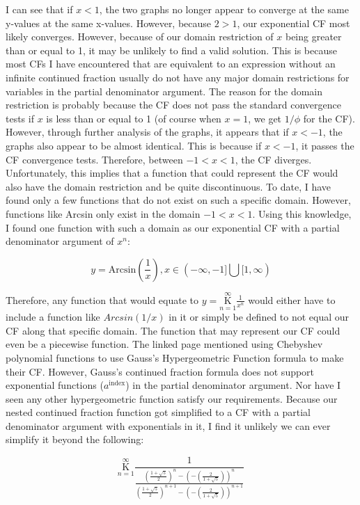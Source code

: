 \documentclass{article}
\begin{document}
I can see that if $x<1$, the two graphs no longer appear to converge at the same y-values at the same x-values. However, because $2>1$, our exponential CF most likely converges. However, because of our domain restriction of $x$ being greater than or equal to 1, it may be unlikely to find a valid solution. This is because most CFs I have encountered that are equivalent to an expression without an infinite continued fraction usually do not have any major domain restrictions for variables in the partial denominator argument. The reason for the domain restriction is probably because the CF does not pass the standard convergence tests if $x$ is less than or equal to 1 (of course when $x=1$, we get $1 / \phi$ for the CF). However, through further analysis of the graphs, it appears that if $x<-1$, the graphs also appear to be almost identical. This is because if $x<-1$, it passes the CF convergence tests. Therefore, between $-1<x<1$, the CF diverges. Unfortunately, this implies that a function that could represent the CF would also have the domain restriction and be quite discontinuous. To date, I have found only a few functions that do not exist on such a specific domain. However, functions like Arcsin only exist in the domain $-1<x<1$. Using this knowledge, I found one function with such a domain as our exponential CF with a partial denominator argument of $x^n$:

$$y=\text{Arcsin}(\frac{1}{x}), x \in (-\infty, -1] \bigcup [1,\infty)$$

Therefore, any function that would equate to $y=\underset{n=1}{\overset{\infty}{ \mathrm K}} \frac{1}{x^n}$ would either have to include a function like $Arcsin(1/x)$ in it or simply be defined to not equal our CF along that specific domain. The function that may represent our CF could even be a piecewise function. The linked page mentioned using Chebyshev polynomial functions to use Gauss’s Hypergeometric Function formula to make their CF. However, Gauss’s continued fraction formula does not support exponential functions ($a^{\text{index}}$) in the partial denominator argument. Nor have I seen any other hypergeometric function satisfy our requirements. Because our nested continued fraction function got simplified to a CF with a partial denominator argument with exponentials in it, I find it unlikely we can ever simplify it beyond the following:

$$\underset{n=1}{\overset{\infty}{ \mathrm K}} \frac{1}{\frac{(\frac{1+\sqrt{5}}{2})^n-(-(\frac{2}{1+\sqrt{5}}))^n}{(\frac{1+\sqrt{5}}{2})^{n+1}-(-(\frac{2}{1+\sqrt{5}}))^{n+1}}}$$
\end{document}
